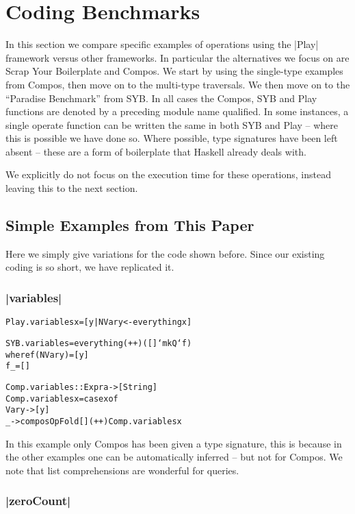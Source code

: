 \documentclass[preprint]{sigplanconf}
\newenvironment{code}{\begin{alltt}\small}{\end{alltt}}
\begin{document}
\section{Coding Benchmarks}

In this section we compare specific examples of operations using the |Play| framework versus other frameworks. In particular the alternatives we focus on are Scrap Your Boilerplate and Compos. We start by using the single-type examples from Compos, then move on to the multi-type traversals. We then move on to the ``Paradise Benchmark'' from SYB. In all cases the Compos, SYB and Play functions are denoted by a preceding module name qualified. In some instances, a single operate function can be written the same in both SYB and Play -- where this is possible we have done so. Where possible, type signatures have been left absent -- these are a form of boilerplate that Haskell already deals with.

We explicitly do not focus on the execution time for these operations, instead leaving this to the next section.

\subsection{Simple Examples from This Paper}

Here we simply give variations for the code shown before. Since our existing coding is so short, we have replicated it.

\subsubsection{|variables|}

\begin{code}
Play.variables x = [y | NVar y <- everything x]

SYB.variables = everything (++) ([] `mkQ` f)
    where  f (NVar y)  = [y]
           f _         = []

Comp.variables :: Expr a -> [String]
Comp.variables x = case x of
    Var y -> [y]
    _ -> composOpFold [] (++) Comp.variables x
\end{code}

In this example only Compos has been given a type signature, this is because in the other examples one can be automatically inferred -- but not for Compos. We note that list comprehensions are wonderful for queries.

\subsubsection{|zeroCount|}
\end{document}
